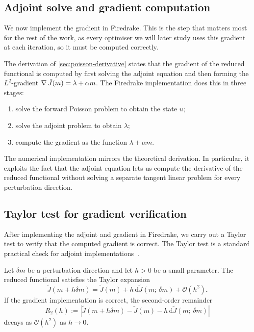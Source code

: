 \documentclass[a4paper,11pt]{article}
\newcommand{\Jt}{\tilde{J}}                  %
\theoremstyle{spacedplain} \newtheorem{theorem}[counter]{Theorem} \newtheorem{lemma}[counter]{Lemma} \newtheorem{prop}[counter]{Proposition} \newtheorem{cor}[counter]{Corollary}
\theoremstyle{spaceddefinition} \newtheorem{defn}[counter]{Definition} \newtheorem{example}[counter]{Example} \newtheorem{remark}[counter]{Remark}
\begin{document}
\subsection{Adjoint solve and gradient computation}
\label{sec:poisson-numerics:adjoint}

We now implement the gradient in Firedrake. This is the step that matters most for the rest of the work, as every optimiser we will later study uses this gradient at each iteration, so it must be computed correctly.

The derivation of \cref{sec:poisson-derivative} states that the gradient of the reduced functional is computed by first solving the adjoint equation and then forming the $L^2$-gradient $\grad \Jt(m) = \lambda + \alpha m$. The Firedrake implementation does this in three stages:
\begin{enumerate}
  \item solve the forward Poisson problem to obtain the state $u$;
  \item solve the adjoint problem to obtain $\lambda$;
  \item compute the gradient as the function $\lambda + \alpha m$.
\end{enumerate}

The numerical implementation mirrors the theoretical derivation. In particular, it exploits the fact that the adjoint equation lets us compute the derivative of the reduced functional without solving a separate tangent linear problem for every perturbation direction.

\subsection{Taylor test for gradient verification}
\label{sec:poisson-numerics:taylor}

After implementing the adjoint and gradient in Firedrake, we carry out a Taylor test to verify that the computed gradient is correct. The Taylor test is a standard practical check for adjoint implementations~\citep{mitusch2019}.

Let $\delta m$ be a perturbation direction and let $h > 0$ be a small parameter. The reduced functional satisfies the Taylor expansion
\begin{equation}
  \Jt(m + h \delta m)
  = \Jt(m) + h\, \mathrm{d}\Jt(m;\, \delta m) + \mathcal{O}(h^{2}).
\end{equation}
If the gradient implementation is correct, the second-order remainder
\begin{equation}
  R_2(h)
  := \left|
       \Jt(m + h \delta m) - \Jt(m) - h\, \mathrm{d}\Jt(m;\, \delta m)
     \right|
\end{equation}
decays as $\mathcal{O}(h^{2})$ as $h \to 0$.
\end{document}
